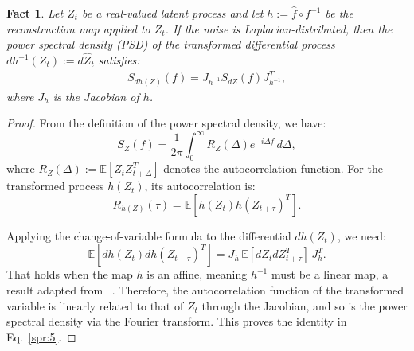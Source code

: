 \documentclass[10pt]{article}
\numberwithin{figure}{section}
\newtheorem{fact}{Fact}
\begin{document}
\begin{fact}
Let $Z_t$ be a real-valued latent process and let $h:= \hat f \circ f^{-1}$ be the reconstruction map applied to $Z_t$.  If the noise is Laplacian-distributed, then the power spectral density (PSD) of the transformed differential process $dh^{-1}(Z_t):= d\hat Z_t $ satisfies:
\begin{align}
    S_{dh(Z)}(f) = J_{h^{-1}} S_{dZ}(f) J_{h^{-1}}^T, \label{spr:5}
\end{align}
where $J_h$ is the Jacobian of $h$.
\end{fact}

\begin{proof}
From the definition of the power spectral density, we have:
\[
S_{Z}(f) = \frac{1}{2\pi} \int_{0}^{\infty} R_Z(\Delta) e^{-i \Delta f} \, d\Delta,
\]
where $R_Z(\Delta) := \mathbb{E}[Z_t Z_{t+\Delta}^T]$ denotes the autocorrelation function. For the transformed process $h(Z_t)$, its autocorrelation is:
\[
R_{h(Z)}(\tau) = \mathbb{E}[h(Z_t) h(Z_{t+\tau})^T].
\]

Applying the change-of-variable formula to the differential $dh(Z_t)$, we need:
\[
\mathbb{E}[dh(Z_t) dh(Z_{t+\tau})^T] = J_h \, \mathbb{E}[dZ_t dZ_{t+\tau}^T] \, J_h^T.
\]
That holds when the map $h$ is an affine, meaning $h^{-1}$ must be a linear map, a result adapted from ~\cite{klindt_towards_2021}.
Therefore, the autocorrelation function of the transformed variable is linearly related to that of $Z_t$ through the Jacobian, and so is the power spectral density via the Fourier transform. This proves the identity in Eq.~\eqref{spr:5}.
\end{proof}
\end{document}
